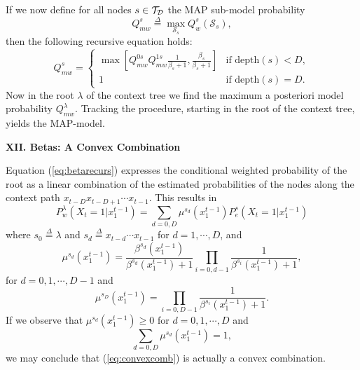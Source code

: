 \documentclass[a4paper,landscape]{slides} %
\newcommand{\cS}{{\mathcal{S}}}
\newcommand{\define}{\stackrel{\Delta}{=}}
\newcommand{\xtm}{x_{1}^{t-1}}
\newcommand{\cTD}{{\cal{T}_{D}}}
\begin{document}
\begin{slide}
If we now define for all nodes $s\in\cTD$ the MAP sub-model probability
\begin{equation*}
Q_{mw}^{s} \define  \max_{\cS_s} Q_{w}^{s}(\cS_{s}),
\end{equation*}
then the following recursive equation holds:
\begin{equation*}
\label{def:MAP}
Q_{mw}^{s} =
\left\{\begin{array}{ll}
                \max [ Q_{mw}^{0s} Q_{mw}^{1s} \frac{1}{\beta_{s}+1} , \frac{\beta_{s}}{\beta_{s}+1} ] &\mbox{if depth$(s)<D,$} \\
                1 &\mbox{if depth$(s)=D.$}
                       \end{array} \right.
\end{equation*}
Now in the root $\lambda$ of the context tree we find the maximum a posteriori model probability $Q_{mw}^{\lambda}$.
Tracking the procedure, starting in the root of the context tree, yields the MAP-model.
\end{slide}
\begin{slide}{\bf\Large\color{blue} XII. Betas: A Convex Combination}

Equation (\ref{eq:betarecurs}) expresses the conditional weighted probability of the root as a linear combination of the estimated probabilities of the nodes along the context path $x_{t-D}x_{t-D+1}\cdots x_{t-1}$.
This results in
\begin{equation}\label{eq:convexcomb}
P_{w}^{\lambda}(X_t=1|\xtm) = \sum_{d=0,D} \mu^{s_d}(\xtm) P_{e}^{s}(X_t=1|\xtm)
\end{equation}
where $s_0\define\lambda$ and $s_d \define x_{t-d} \cdots x_{t-1}$ for $d=1,\cdots,D$, and
\begin{equation}
\mu^{s_{d}}(\xtm) = \frac{\beta^{s_d}(\xtm)}{\beta^{s_d}(\xtm)+1} \prod_{i=0,d-1} \frac{1} {\beta^{s_i}(\xtm)+1},\label{def:mua}
\end{equation}
for $d=0,1,\cdots,D-1$ and
\begin{equation}
\mu^{s_{D}}(\xtm) =  \prod_{i=0,D-1} \frac{1} {\beta^{s_i}(\xtm)+1}.\label{def:mub}
\end{equation}
If we observe that $\mu^{s_d}(\xtm) \geq 0$ for $d=0,1,\cdots,D$ and
\begin{equation*}
\sum_{d=0,D} \mu^{s_d}(\xtm) = 1,
\end{equation*}
we may conclude that (\ref{eq:convexcomb}) is actually a convex combination.
\end{slide}
\end{document}
